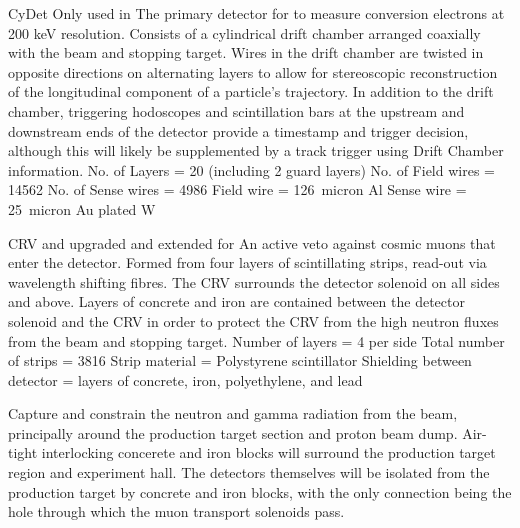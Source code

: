 {CyDet}
{}
{Only used in \phaseI}
{The primary detector for \phaseI to measure conversion electrons at 200 keV resolution.  Consists of a cylindrical drift chamber arranged coaxially with the beam and stopping target.  Wires in the drift chamber are twisted in opposite directions on alternating layers to allow for stereoscopic reconstruction of the longitudinal component of a particle's trajectory.  In addition to the drift chamber, triggering hodoscopes and scintillation bars at the upstream and downstream ends of the detector provide a timestamp and trigger decision, although this will likely be supplemented by a track trigger using Drift Chamber information.}
{No. of Layers = 20 (including 2 guard layers) No. of Field wires = 14562 No. of Sense wires = 4986 Field wire = 126~micron Al Sense wire = 25~micron Au plated W \vspace{2cm}}

{CRV}
{}
{\phaseI and upgraded and extended for \phaseII }
{An active veto against cosmic muons that enter the detector.  Formed from four layers of scintillating strips, read-out via wavelength shifting fibres.  The CRV surrounds the detector solenoid on all sides and above.  Layers of concrete and iron are contained between the detector solenoid and the CRV in order to protect the CRV from the high neutron fluxes from the beam and stopping target. }
{Number of layers = 4 per side Total number of strips = 3816  Strip material = Polystyrene scintillator Shielding between detector = layers of concrete, iron, polyethylene, and lead \vspace{-1cm}}

{}
{}
{\phaseI}
{Capture and constrain the neutron and gamma radiation from the beam, principally around the production target section and proton beam dump.  Air-tight interlocking concerete and iron blocks will surround the production target region and experiment hall.  The detectors themselves will be isolated from the production target by concrete and iron blocks, with the only connection being the hole through which the muon transport solenoids pass. }
{\vspace{3cm}}
